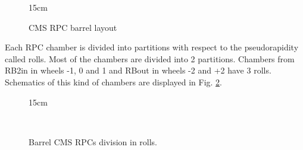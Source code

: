\begin{figure}[!htm]{15cm}
\caption{CMS RPC barrel layout}%
\label{fig:RPC_barrel_layout}
\end{figure}

Each RPC chamber is divided into partitions with respect to the pseudorapidity called rolls. Most of the chambers are divided into 2 partitions. Chambers from RB2in in wheels -1, 0 and 1 and RBout in wheels -2 and +2 have 3 rolls. Schematics of this kind of chambers are displayed in Fig. \ref{fig:barrel_chamber_types}.

\begin{figure}[!htm]{15cm}
  \caption{Barrel CMS RPCs division in rolls.} 
  \label{fig:barrel_chamber_types}
  \hfill
  \\
\end{figure}

